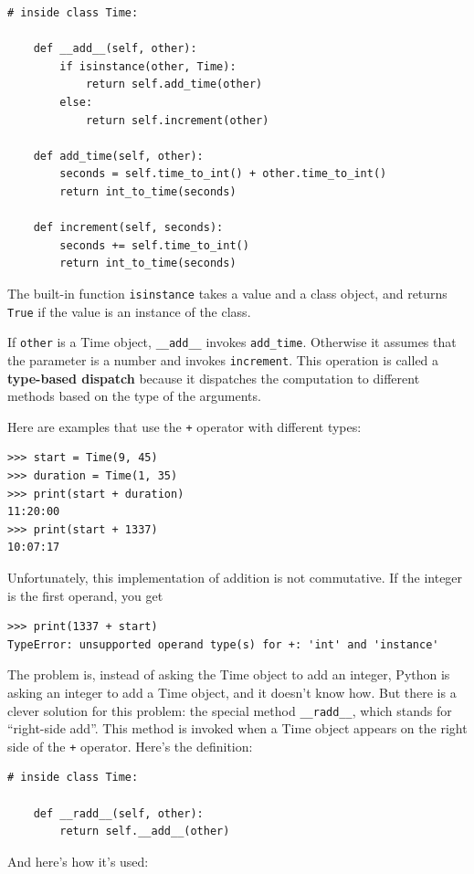\documentclass[10pt]{book}
\begin{document}
\begin{verbatim}
# inside class Time:

    def __add__(self, other):
        if isinstance(other, Time):
            return self.add_time(other)
        else:
            return self.increment(other)

    def add_time(self, other):
        seconds = self.time_to_int() + other.time_to_int()
        return int_to_time(seconds)

    def increment(self, seconds):
        seconds += self.time_to_int()
        return int_to_time(seconds)
\end{verbatim}
%
The built-in function {\tt isinstance} takes a value and a
class object, and returns {\tt True} if the value is an instance
of the class.

If {\tt other} is a Time object, \verb"__add__" invokes
\verb"add_time".  Otherwise it assumes that the parameter
is a number and invokes {\tt increment}.  This operation is
called a {\bf type-based dispatch} because it dispatches the
computation to different methods based on the type of the
arguments.

Here are examples that use the {\tt +} operator with different
types:

\begin{verbatim}
>>> start = Time(9, 45)
>>> duration = Time(1, 35)
>>> print(start + duration)
11:20:00
>>> print(start + 1337)
10:07:17
\end{verbatim}
%
Unfortunately, this implementation of addition is not commutative.
If the integer is the first operand, you get

\begin{verbatim}
>>> print(1337 + start)
TypeError: unsupported operand type(s) for +: 'int' and 'instance'
\end{verbatim}
%
The problem is, instead of asking the Time object to add an integer,
Python is asking an integer to add a Time object, and it doesn't know
how.  But there is a clever solution for this problem: the
special method \verb"__radd__", which stands for ``right-side add''.
This method is invoked when a Time object appears on the right side of
the {\tt +} operator.  Here's the definition:

\begin{verbatim}
# inside class Time:

    def __radd__(self, other):
        return self.__add__(other)
\end{verbatim}
%
And here's how it's used:
\end{document}
